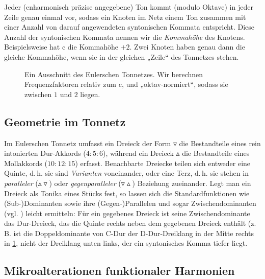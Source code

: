 Jeder (enharmonisch präzise angegebene) Ton kommt (modulo Oktave) in jeder Zeile
genau einmal vor, sodass ein Knoten im Netz einem Ton zusammen mit einer Anzahl
von darauf angewendeten syntonischen Kommata entspricht. Diese Anzahl der
syntonischen Kommata nennen wir die \emph{Kommahöhe} des Knotens. Beispielsweise
hat \sharppp c die Kommahöhe $+2$. Zwei Knoten haben genau dann die gleiche
Kommahöhe, wenn sie in der gleichen „Zeile“ des Tonnetzes stehen.

\begin{figure}[h]
  
  \caption{Ein Ausschnitt des Eulerschen Tonnetzes. Wir berechnen
    Frequenzfaktoren relativ zum c, und „oktav-normiert“, sodass sie zwischen
    $1$ und $2$ liegen.}\label{fig:latticeExcerpt}
\end{figure}

\subsection{Geometrie im Tonnetz}

Im Eulerschen Tonnetz umfasst ein Dreieck der Form $\triangledown$ die
Bestandteile eines rein intonierten Dur-Akkords ($4:5:6$), während ein Dreieck
$\vartriangle$ die Bestandteile eines Mollakkords ($10:12:15$)
erfasst. Benachbarte Dreiecke teilen sich entweder eine Quinte, d.\,h. sie sind
\emph{Varianten} voneinander, oder eine Terz, d.\,h. sie stehen in
\emph{paralleler} ($\vartriangle\!\!\!\triangledown$) oder
\emph{gegenparalleler} ($\triangledown\!\!\!\vartriangle$) Beziehung
zueinander. Legt man ein Dreieck als Tonika eines Stücks fest, so lassen sich
die Standardfunktionen wie \mbox{(Sub-)}Dominanten sowie ihre (Gegen-)Parallelen
und sogar Zwischendominanten (vgl. \cite[§\,10]{Skript}) leicht ermitteln: Für
ein gegebenes Dreieck ist seine Zwischendominante das Dur-Dreieck, das die
Quinte rechts neben dem gegebenen Dreieck enthält (z.\,B.  ist die
Doppeldominante von C-Dur der D-Dur-Dreiklang in der Mitte rechts in
\cref{fig:latticeExcerpt}, nicht der Dreiklang unten links, der ein syntonisches
Komma tiefer liegt.

\subsection{Mikroalterationen funktionaler Harmonien}

